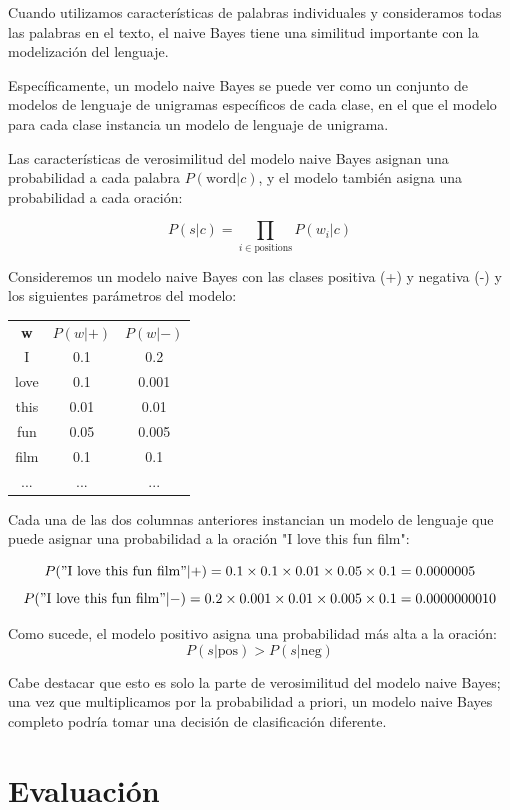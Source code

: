 \documentclass[11pt,fleqn]{book} %
\begin{document}
Cuando utilizamos características de palabras individuales y consideramos todas las palabras en el texto, el naive Bayes tiene una similitud importante con la modelización del lenguaje.

Específicamente, un modelo naive Bayes se puede ver como un conjunto de modelos de lenguaje de unigramas específicos de cada clase, en el que el modelo para cada clase instancia un modelo de lenguaje de unigrama.

Las características de verosimilitud del modelo naive Bayes asignan una probabilidad a cada palabra $P(\text{word}|c)$, y el modelo también asigna una probabilidad a cada oración:

\[P(s|c) = \prod_{i\in \text{positions}} P(w_i|c)\]

Consideremos un modelo naive Bayes con las clases positiva (+) y negativa (-) y los siguientes parámetros del modelo:

\begin{center}
\begin{tabular}{ccc}
\textbf{w} & $P(w|+)$ & $P(w|-)$ \\
I & 0.1 & 0.2 \\
love & 0.1 & 0.001 \\
this & 0.01 & 0.01 \\
fun & 0.05 & 0.005 \\
film & 0.1 & 0.1 \\
... & ... & ...
\end{tabular}
\end{center}

Cada una de las dos columnas anteriores instancian un modelo de lenguaje que puede asignar una probabilidad a la oración "I love this fun film":

\[P("\text{I love this fun film}"|+) = 0.1 \times 0.1 \times 0.01 \times 0.05 \times 0.1 = 0.0000005\]
\[P("\text{I love this fun film}"|-) = 0.2 \times 0.001 \times 0.01 \times 0.005 \times 0.1 = 0.0000000010\]

Como sucede, el modelo positivo asigna una probabilidad más alta a la oración:
\[P(s|\text{pos}) > P(s|\text{neg})\]

Cabe destacar que esto es solo la parte de verosimilitud del modelo naive Bayes; una vez que multiplicamos por la probabilidad a priori, un modelo naive Bayes completo podría tomar una decisión de clasificación diferente.



\section{Evaluación}
\end{document}

